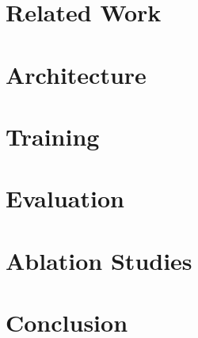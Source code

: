 \documentclass[sigconf]{acmart}
\begin{document}
\section{Related Work}
\label{sec:related}


\section{Architecture}
\label{sec:method}


\section{Training}
\label{sec:training}


\section{Evaluation}
\label{sec:experiments}


\section{Ablation Studies}
\label{sec:ablation}


\section{Conclusion}
\label{sec:conclusion}




\end{document}

